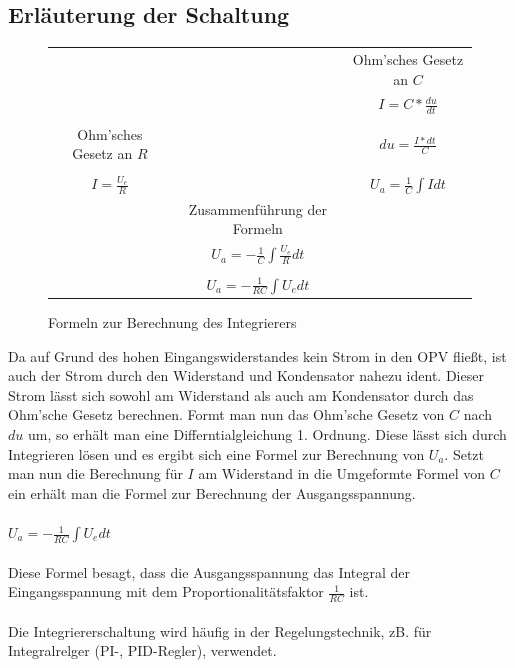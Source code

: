 \subsection{Erl\"auterung der Schaltung}
\begin{figure}[H]
  \centering
  \begin{tabular}{ccc}
    & & Ohm'sches Gesetz an $C$ \\
    & & $I=C*\frac{du}{dt}$ \\ \\
    Ohm'sches Gesetz an $R$& & $du = \frac{I*dt}{C}$ \\ \\
    $I=\frac{U_e}{R}$ & & $U_a=\frac{1}{C}\int I dt$ \\
    & Zusammenf\"uhrung der Formeln & \\
    & $U_a = -\frac{1}{C} \int \frac{U_e}{R} dt$ & \\ \\
    & $U_a = -\frac{1}{RC} \int U_e dt$ & \\
  \end{tabular}
  \caption{Formeln zur Berechnung des Integrierers}
\end{figure}
\noindent
Da auf Grund des hohen Eingangswiderstandes kein Strom in den OPV flie\ss{}t, ist auch der Strom durch den Widerstand und Kondensator nahezu ident. Dieser Strom l\"asst sich sowohl am Widerstand als auch am Kondensator durch das Ohm'sche Gesetz berechnen. Formt man nun das Ohm'sche Gesetz von $C$ nach $du$ um, so erh\"alt man eine Differntialgleichung 1. Ordnung. Diese l\"asst sich durch Integrieren l\"osen und es ergibt sich eine Formel zur Berechnung von $U_a$. Setzt man nun die Berechnung f\"ur $I$ am Widerstand in die Umgeformte Formel von $C$ ein erh\"alt man die Formel zur Berechnung der Ausgangsspannung. \\ \\
$U_a = -\frac{1}{RC} \int U_e dt$ \\  \\
Diese Formel besagt, dass die Ausgangsspannung das Integral der Eingangsspannung mit dem Proportionalit\"atsfaktor $\frac{1}{RC}$ ist. \\ \\
Die Integriererschaltung wird häufig in der Regelungstechnik, zB. f\"ur Integralrelger (PI-, PID-Regler), verwendet.

\newpage
